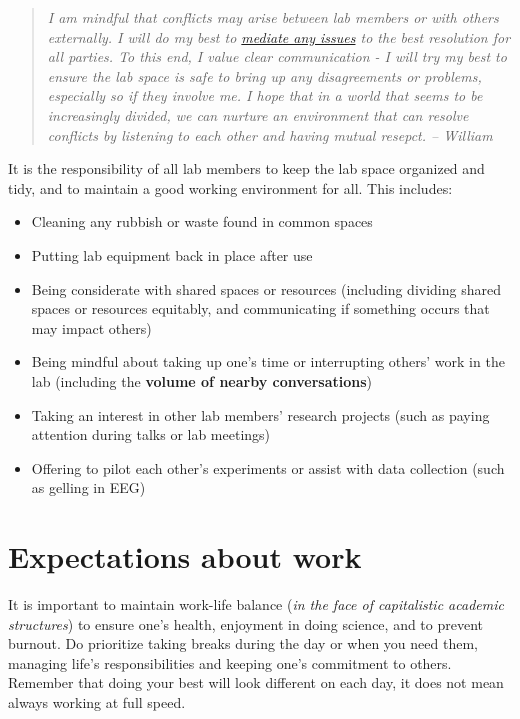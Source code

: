 \documentclass[
]{book}
\providecommand{\tightlist}{%
  \setlength{\itemsep}{0pt}\setlength{\parskip}{0pt}}
\begin{document}
\begin{quote}
\emph{I am mindful that conflicts may arise between lab members or with others externally. I will do my best to \protect\hyperlink{conflicts}{mediate any issues} to the best resolution for all parties. To this end, I value clear communication - I will try my best to ensure the lab space is safe to bring up any disagreements or problems, especially so if they involve me. I hope that in a world that seems to be increasingly divided, we can nurture an environment that can resolve conflicts by listening to each other and having mutual resepct. -- William}
\end{quote}

It is the responsibility of all lab members to keep the lab space organized and tidy, and to maintain a good working environment for all. This includes:

\begin{itemize}
\tightlist
\item
  Cleaning any rubbish or waste found in common spaces
\item
  Putting lab equipment back in place after use
\item
  Being considerate with shared spaces or resources (including dividing shared spaces or resources equitably, and communicating if something occurs that may impact others)
\item
  Being mindful about taking up one's time or interrupting others' work in the lab (including the \textbf{volume of nearby conversations})
\item
  Taking an interest in other lab members' research projects (such as paying attention during talks or lab meetings)
\item
  Offering to pilot each other's experiments or assist with data collection (such as gelling in EEG)
\end{itemize}

\hypertarget{lab-work}{%
\section{Expectations about work}\label{lab-work}}

It is important to maintain work-life balance (\emph{in the face of capitalistic academic structures}) to ensure one's health, enjoyment in doing science, and to prevent burnout. Do prioritize taking breaks during the day or when you need them, managing life's responsibilities and keeping one's commitment to others. Remember that doing your best will look different on each day, it does not mean always working at full speed.
\end{document}
